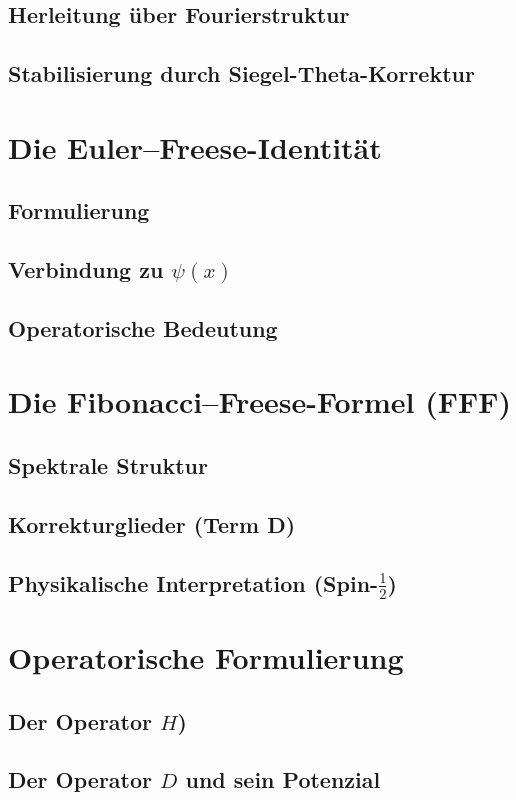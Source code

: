 \documentclass[12pt]{article}
\begin{document}
\subsection{Herleitung über Fourierstruktur}
\subsection{Stabilisierung durch Siegel-Theta-Korrektur}

\section{Die Euler--Freese-Identität}
\subsection{Formulierung}
\subsection{Verbindung zu \texorpdfstring{$\psi(x)$}{psi(x)}}
\subsection{Operatorische Bedeutung}

\section{Die Fibonacci--Freese-Formel (FFF)}
\subsection{Spektrale Struktur}
\subsection{Korrekturglieder (Term D)}
\subsection{Physikalische Interpretation (Spin-\texorpdfstring{$\frac{1}{2}$}{1/2})}

\section{Operatorische Formulierung}
\subsection{Der Operator \texorpdfstring{$H$}{H})}
\subsection{Der Operator \texorpdfstring{$D$}{D} und sein Potenzial}
\end{document}
